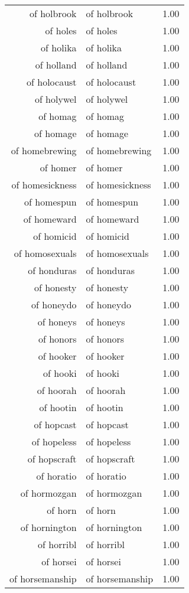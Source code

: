 \begin{table}[ht]
\begin{tabular}{rlr}
  of holbrook & of holbrook & 1.00 \\ 
  of holes & of holes & 1.00 \\ 
  of holika & of holika & 1.00 \\ 
  of holland & of holland & 1.00 \\ 
  of holocaust & of holocaust & 1.00 \\ 
  of holywel & of holywel & 1.00 \\ 
  of homag & of homag & 1.00 \\ 
  of homage & of homage & 1.00 \\ 
  of homebrewing & of homebrewing & 1.00 \\ 
  of homer & of homer & 1.00 \\ 
  of homesickness & of homesickness & 1.00 \\ 
  of homespun & of homespun & 1.00 \\ 
  of homeward & of homeward & 1.00 \\ 
  of homicid & of homicid & 1.00 \\ 
  of homosexuals & of homosexuals & 1.00 \\ 
  of honduras & of honduras & 1.00 \\ 
  of honesty & of honesty & 1.00 \\ 
  of honeydo & of honeydo & 1.00 \\ 
  of honeys & of honeys & 1.00 \\ 
  of honors & of honors & 1.00 \\ 
  of hooker & of hooker & 1.00 \\ 
  of hooki & of hooki & 1.00 \\ 
  of hoorah & of hoorah & 1.00 \\ 
  of hootin & of hootin & 1.00 \\ 
  of hopcast & of hopcast & 1.00 \\ 
  of hopeless & of hopeless & 1.00 \\ 
  of hopscraft & of hopscraft & 1.00 \\ 
  of horatio & of horatio & 1.00 \\ 
  of hormozgan & of hormozgan & 1.00 \\ 
  of horn & of horn & 1.00 \\ 
  of hornington & of hornington & 1.00 \\ 
  of horribl & of horribl & 1.00 \\ 
  of horsei & of horsei & 1.00 \\ 
  of horsemanship & of horsemanship & 1.00 \\ 

\end{tabular}
\end{table}
